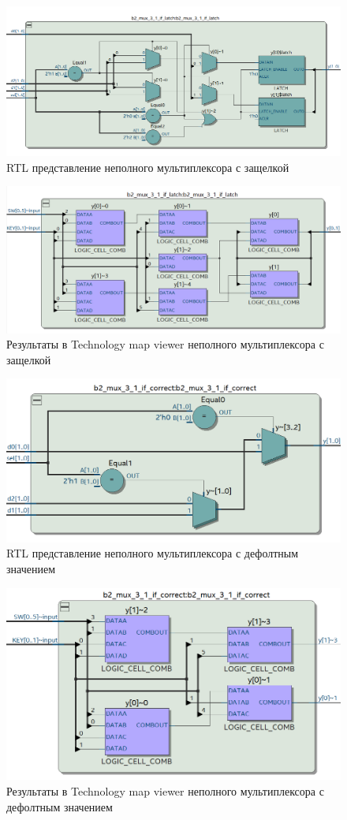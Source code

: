 \documentclass[a4paper,14pt]{article}
\begin{document}

\begin{figure}[H]
	\centering
	\includegraphics[width=0.6\linewidth]{img/z4_rtl_if_latch}
	\caption{RTL представление неполного мультиплексора с защелкой}
	\label{fig:z4_rtl_if_latch}
\end{figure}

\begin{figure}[H]
	\centering
	\includegraphics[width=0.6\linewidth]{img/z4_tmv_if_latch}
	\caption{Результаты в Technology map viewer неполного мультиплексора с защелкой}
	\label{fig:z4_tmv_if_latch}
\end{figure}


\begin{figure}[H]
	\centering
	\includegraphics[width=0.6\linewidth]{img/z4_rtl_if_correct}
	\caption{RTL представление неполного мультиплексора с дефолтным значением}
	\label{fig:z4_rtl_if_correct}
\end{figure}

\begin{figure}[H]
	\centering
	\includegraphics[width=0.6\linewidth]{img/z4_tmv_if_correct}
	\caption{Результаты в Technology map viewer неполного мультиплексора с дефолтным значением}
	\label{fig:z4_tmv_if_correct}
\end{figure}
\end{document}

